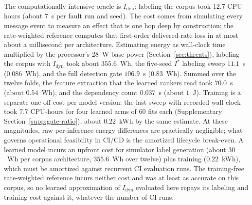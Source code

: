 The computationally intensive oracle is $I_{\text{dyn}}$: labeling the corpus took $12.7$ CPU-hours (about $7$~s per fault run and seed). The cost comes from simulating every message event to measure an effect that is one hop deep by construction; the rate-weighted reference computes that first-order delivered-rate loss in at most about a millisecond per architecture. Estimating energy as wall-clock time multiplied by the processor's $28$~W base power (Section~\ref{sec:threats}), labeling the corpus with $I_{\text{dyn}}$ took about $355.6$~Wh, the five-seed $I^*$ labeling sweep $11.1$~s ($0.086$~Wh), and the full detection gate $106.9$~s ($0.83$~Wh). Summed over the twelve folds, the feature extraction that the learned rankers read took $70.0$~s (about $0.54$~Wh), and the dependency count $0.037$~s (about $1$~J). Training is a separate one-off cost per model version: the last sweep with recorded wall-clock took $7.7$ CPU-hours for four learned arms of 60 fits each (Supplementary Section~\ref{supp:gate-ratio}), about $0.22$~kWh by the same estimate. At these magnitudes, raw per-inference energy differences are practically negligible; what governs operational feasibility in CI/CD is the amortized lifecycle break-even. A learned model incurs an upfront cost for simulator label generation (about $30$~Wh per corpus architecture, $355.6$~Wh over twelve) plus training ($0.22$~kWh), which must be amortized against recurrent CI evaluation runs. The training-free rate-weighted reference incurs neither cost and was at least as accurate on this corpus, so no learned approximation of $I_{\text{dyn}}$ evaluated here repays its labeling and training cost against it, whatever the number of CI runs.
